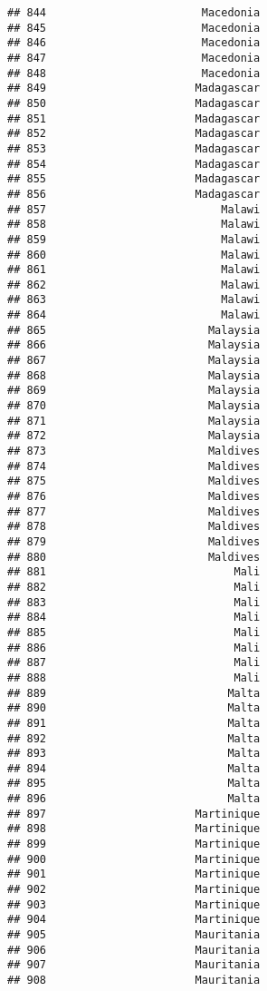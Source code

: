 \documentclass[]{article}
\begin{document}
\begin{verbatim}
## 844                        Macedonia
## 845                        Macedonia
## 846                        Macedonia
## 847                        Macedonia
## 848                        Macedonia
## 849                       Madagascar
## 850                       Madagascar
## 851                       Madagascar
## 852                       Madagascar
## 853                       Madagascar
## 854                       Madagascar
## 855                       Madagascar
## 856                       Madagascar
## 857                           Malawi
## 858                           Malawi
## 859                           Malawi
## 860                           Malawi
## 861                           Malawi
## 862                           Malawi
## 863                           Malawi
## 864                           Malawi
## 865                         Malaysia
## 866                         Malaysia
## 867                         Malaysia
## 868                         Malaysia
## 869                         Malaysia
## 870                         Malaysia
## 871                         Malaysia
## 872                         Malaysia
## 873                         Maldives
## 874                         Maldives
## 875                         Maldives
## 876                         Maldives
## 877                         Maldives
## 878                         Maldives
## 879                         Maldives
## 880                         Maldives
## 881                             Mali
## 882                             Mali
## 883                             Mali
## 884                             Mali
## 885                             Mali
## 886                             Mali
## 887                             Mali
## 888                             Mali
## 889                            Malta
## 890                            Malta
## 891                            Malta
## 892                            Malta
## 893                            Malta
## 894                            Malta
## 895                            Malta
## 896                            Malta
## 897                       Martinique
## 898                       Martinique
## 899                       Martinique
## 900                       Martinique
## 901                       Martinique
## 902                       Martinique
## 903                       Martinique
## 904                       Martinique
## 905                       Mauritania
## 906                       Mauritania
## 907                       Mauritania
## 908                       Mauritania

\end{verbatim}
\end{document}
